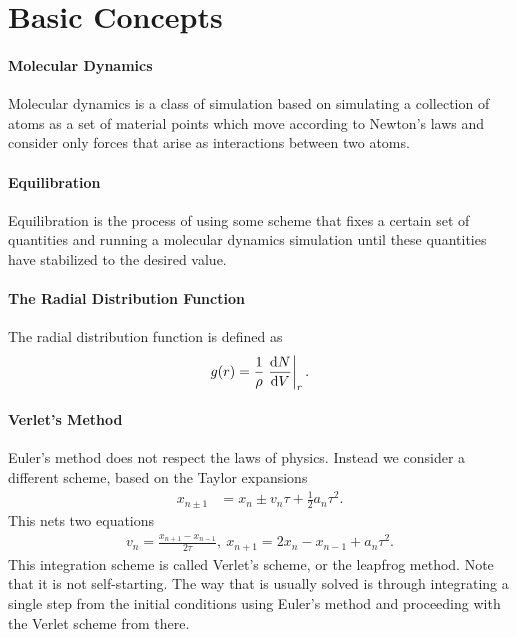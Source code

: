\section{Basic Concepts}

\paragraph{Molecular Dynamics}
Molecular dynamics is a class of simulation based on simulating a collection of atoms as a set of material points which move according to Newton's laws and consider only forces that arise as interactions between two atoms.

\paragraph{Equilibration}
Equilibration is the process of using some scheme that fixes a certain set of quantities and running a molecular dynamics simulation until these quantities have stabilized to the desired value.

\paragraph{The Radial Distribution Function}
The radial distribution function is defined as
\begin{align*}
	g(r) = \frac{1}{\rho}\eval{\dv{N}{V}}_{r}.
\end{align*}

\paragraph{Verlet's Method}
Euler's method does not respect the laws of physics. Instead we consider a different scheme, based on the Taylor expansions
\begin{align*}
	x_{n \pm 1} &= x_{n} \pm v_{n}\tau + \frac{1}{2}a_{n}\tau^{2}.
\end{align*}
This nets two equations
\begin{align*}
	v_{n} = \frac{x_{n + 1} - x_{n - 1}}{2\tau},\ x_{n + 1} = 2x_{n} - x_{n - 1} + a_{n}\tau^{2}.
\end{align*}
This integration scheme is called Verlet's scheme, or the leapfrog method. Note that it is not self-starting. The way that is usually solved is through integrating a single step from the initial conditions using Euler's method and proceeding with the Verlet scheme from there.